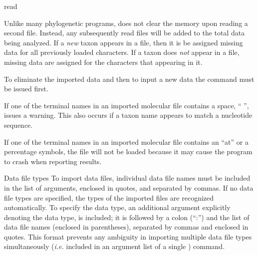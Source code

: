 \begin{command}{read}{}
\begin{poydescription}
        \begin{statement}
           \setlength{\parindent}{0.5cm}
            Unlike many phylogenetic programs, \poy does not clear the memory
            upon reading a second file. Instead, any subsequently read files
            will be added to the total data being analyzed.  If a \emph{new} taxon
            appears in a file, then it is be assigned missing data for all
            previously loaded characters. If a taxon does \emph{not} appear in a
            file, missing data are assigned for the characters that appearing in it. 
            
            \indent To eliminate the imported data and then to input a new data
            the  command must be issued
            first. 
        \end{statement}
        
        \begin{statement}
           \setlength{\parindent}{0.5cm}
             If one of the terminal names in an imported molecular file contains
             a space, `` '', \poy issues a warning. This also occurs if a
             taxon name appears to match a nucleotide sequence.

             \indent If one of the terminal names in an imported molecular file contains
             an ``at'' or a percentage symbols, the file will not be loaded because
             it may cause the program to crash when reporting results.
         \end{statement}
	\end{poydescription}

	\begin{arguments}

	    \begin{argumentgroup}{Data file types}
	        To import data files, individual data file names must be included in
            the list of  arguments, enclosed in quotes, and
            separated by commas. If no data file types are specified, the types
            of the imported files are recognized automatically. To specify the
            data type, an additional argument explicitly denoting the data type,
            is included; it is followed by a colon (``:'') and the list of data
            file names (enclosed in parentheses), separated by commas and
            enclosed in quotes. This format prevents any ambiguity in importing
            multiple data file types simultaneously (\emph{i.e.} included in an
            argument list of a single ) command.


\end{argumentgroup}
\end{arguments}
\end{command}
